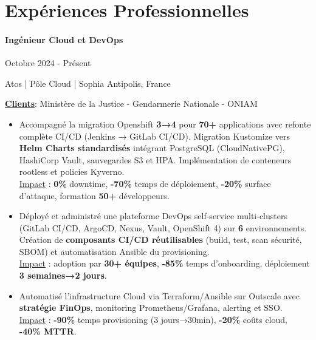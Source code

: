 \documentclass{article}
\begin{document}
\vspace{4ex}
\hrulefill
\section*{Expériences Professionnelles}

\paragraph{Ingénieur Cloud et DevOps}\hspace*{\fill}Octobre 2024 - Présent

\noindent
Atos | Pôle Cloud | Sophia Antipolis, France

\noindent
\textbf{\underline{Clients}}: Ministère de la Justice - Gendarmerie Nationale - ONIAM

\raggedright  
\begin{itemize}
    \item{Accompagné la migration Openshift \textbf{3→4} pour \textbf{70+} applications avec refonte complète CI/CD (Jenkins → GitLab CI/CD). Migration Kustomize vers \textbf{Helm Charts standardisés} intégrant PostgreSQL (CloudNativePG), HashiCorp Vault, sauvegardes S3 et HPA. Implémentation de conteneurs rootless et policies Kyverno.\\ \underline{Impact} : \textbf{0\%} downtime, \textbf{-70\%} temps de déploiement, \textbf{-20\%} surface d'attaque, formation \textbf{50+} développeurs.}
    \item{Déployé et administré une plateforme DevOps self-service multi-clusters (GitLab CI/CD, ArgoCD, Nexus, Vault, OpenShift 4) sur \textbf{6} environnements. Création de \textbf{composants CI/CD réutilisables} (build, test, scan sécurité, SBOM) et automatisation Ansible du provisioning.\\ \underline{Impact} : adoption par \textbf{30+ équipes}, \textbf{-85\%} temps d'onboarding, déploiement \textbf{3 semaines→2 jours}.}
    \item{Automatisé l'infrastructure Cloud via Terraform/Ansible sur Outscale avec \textbf{stratégie FinOps}, monitoring Prometheus/Grafana, alerting et SSO.\\ \underline{Impact} : \textbf{-90\%} temps provisioning (3 jours→30min), \textbf{-20\%} coûts cloud, \textbf{-40\% MTTR}.}
\end{itemize}
\end{document}
